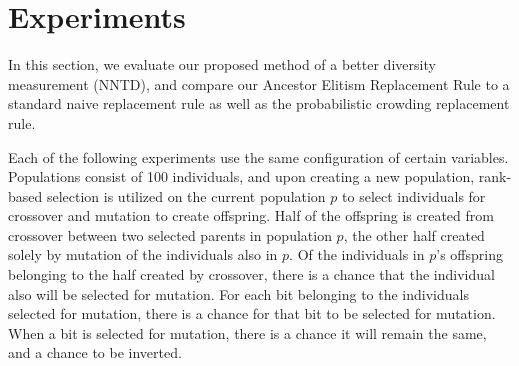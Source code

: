 \section{Experiments}
In this section, we evaluate our proposed method of a better diversity measurement (NNTD), and compare our Ancestor Elitism Replacement Rule to a standard naive replacement rule as well as the probabilistic crowding replacement rule.

Each of the following experiments use the same configuration of certain variables. Populations consist of \num{100} individuals, and upon creating a new population, rank-based selection is utilized on the current population $p$ to select individuals for crossover and mutation to create offspring. Half of the offspring is created from crossover between two selected parents in population $p$, the other half created solely by mutation of the individuals also in $p$. Of the individuals in $p$'s offspring belonging to the half created by crossover, there is a  chance that the individual also will be selected for mutation. For each bit belonging to the individuals selected for mutation, there is a  chance for that bit to be selected for mutation. When a bit is selected for mutation, there is a  chance it will remain the same, and a  chance to be inverted.



